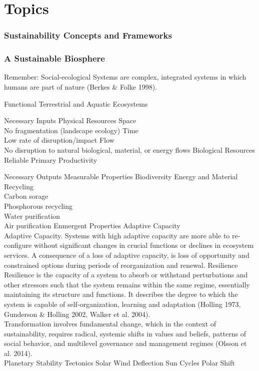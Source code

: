 \documentclass[12pt, letterpaper]{article}
\begin{document}
\section{Topics}
\subsubsection{Sustainability Concepts and Frameworks}
\begin{outline}[enumerate]
\1 

\end{outline}


\subsubsection{A Sustainable Biosphere}
Remember: Social-ecological Systems are complex, integrated systems in which humans are part of nature (Berkes \& Folke 1998).

\begin{outline}[enumerate]
\1 Functional Terrestrial and Aquatic Ecosystems

\2 Necessary Inputs
\3 Physical Resources
\4 Space\\
No fragmentation (landscape ecology)
\4 Time\\
Low rate of disruption/impact
\4 Flow\\
No disruption to natural biological, material, or energy flows
\3 Biological Resources
\4 Reliable Primary Productivity

\2 Necessary Outputs
\3 Measurable Properties
\4 Biodiversity
\4 Energy and Material Recycling\\
Carbon sorage\\
Phosphorous recycling\\
Water purification\\
Air purification
\3 Enmergent Properties
\4 Adaptive Capacity\\
Adaptive Capacity. Systems with high adaptive capacity are more able to re-configure without significant changes in crucial functions or declines in ecosystem services. A consequence of a loss of adaptive capacity, is loss of opportunity and constrained options during periods of reorganization and renewal.
\4 Resilience \\
Resilience is the capacity of a system to absorb or withstand perturbations and other stressors such that the system remains within the same regime, essentially maintaining its structure and functions. It describes the degree to which the system is capable of self-organization, learning and adaptation (Holling 1973, Gunderson \& Holling 2002, Walker et al. 2004). \\

Transformation involves fundamental change, which in the context of sustainability, requires radical, systemic shifts in values and beliefs, patterns of social behavior, and multilevel governance and management regimes (Olsson et al. 2014).\\

\1 Planetary Stability
\2 Tectonics
\2 Solar Wind Deflection
\3 Sun Cycles
\3 Polar Shift

\end{outline}
\end{document}
